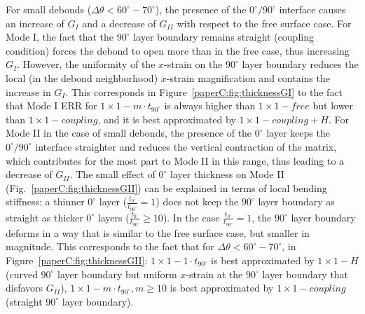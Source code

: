 For small debonds ($\Delta\theta<60^{\circ}-70^{\circ}$), the presence of the $0^{\circ}/90^{\circ}$ interface causes an increase of $G_{I}$ and a decrease of $G_{II}$ with respect to the free surface case. For Mode I, the fact that the $90^{\circ}$ layer boundary remains straight (coupling condition) forces the debond to open more than in the free case, thus increasing $G_{I}$. However, the uniformity of the $x$-strain on the $90^{\circ}$ layer boundary reduces the local (in the debond neighborhood) $x$-strain magnification and contains the increase in $G_{I}$. This corresponds in Figure~\ref{paperC:fig:thicknessGI} to the fact that Mode I ERR for $1\times1-m\cdot t_{90^{\circ}}$ is always higher than $1\times1-free$ but lower than $1\times1-coupling$, and it is best approximated by $1\times1-coupling+H$. For Mode II in the case of small debonds, the presence of the $0^{\circ}$ layer  keeps the $0^{\circ}/90^{\circ}$ interface straighter and reduces the vertical contraction of the matrix, which contributes for the most part to Mode II in this range, thus leading to a decrease of $G_{II}$. The small effect of $0^{\circ}$ layer thickness on Mode II (Fig.~\ref{paperC:fig:thicknessGII}) can be explained in terms of local bending stiffness: a thinner $0^{\circ}$ layer ($\frac{t_{0^{\circ}}}{t_{90^{\circ}}}=1$) does not keep the $90^{\circ}$ layer boundary as straight as thicker $0^{\circ}$ layers ($\frac{t_{0^{\circ}}}{t_{90^{\circ}}}\geq10$). In the case $\frac{t_{0^{\circ}}}{t_{90^{\circ}}}=1$, the $90^{\circ}$ layer boundary deforms in a way that is similar to the free surface case, but smaller in magnitude. This corresponds to the fact that for $\Delta\theta<60^{\circ}-70^{\circ}$, in Figure~\ref{paperC:fig:thicknessGII}: $1\times1-1\cdot t_{90^{\circ}}$ is best approximated by $1\times1-H$ (curved $90^{\circ}$ layer boundary but uniform $x$-strain at the $90^{\circ}$ layer boundary that disfavors $G_{II}$), $1\times1-m\cdot t_{90^{\circ}},m\geq10$ is best approximated by $1\times1-coupling$ (straight $90^{\circ}$ layer boundary).\\
